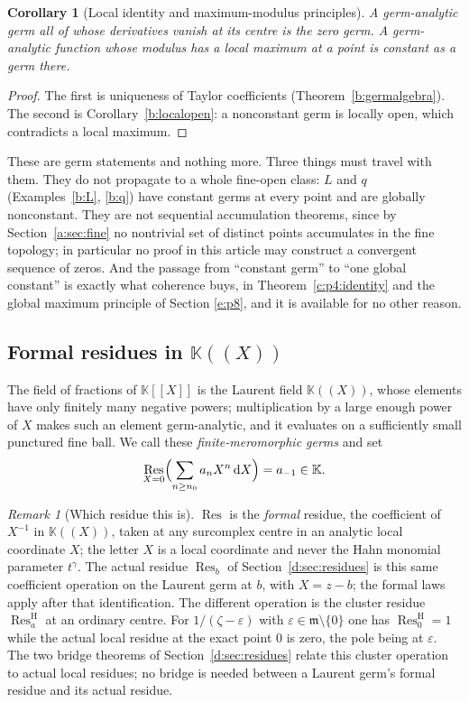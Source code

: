 \documentclass[11pt,a4paper]{article}
\numberwithin{equation}{section}
\newtheorem{corollary}[theorem]{Corollary}
\theoremstyle{definition}
\theoremstyle{remark}
\newtheorem{remark}[theorem]{Remark}
\theoremstyle{plain}
\newcommand{\K}{\mathbb K}
\newcommand{\mm}{\mathfrak m}
\newcommand{\tm}{t}
\DeclareMathOperator{\Res}{Res}                 %
\newcommand{\ResH}[1]{\Res^{\mathrm H}_{#1}}    %
\newcommand{\Resat}[1]{\Res_{#1}}               %
\newcommand{\dd}{\mathrm d}
\begin{document}
\begin{corollary}[Local identity and maximum-modulus principles]
\label{b:localidentity}
A germ-analytic germ all of whose derivatives vanish at its centre is the
zero germ. A germ-analytic function whose modulus has a local maximum at a
point is constant \emph{as a germ} there.
\end{corollary}

\begin{proof}
The first is uniqueness of Taylor coefficients
(Theorem~\ref{b:germalgebra}). The second is
Corollary~\ref{b:localopen}: a nonconstant germ is locally open, which
contradicts a local maximum.
\end{proof}

These are germ statements and nothing more. Three things must travel with
them. They do not propagate to a whole fine-open class: $L$ and $q$
(Examples~\ref{b:L}, \ref{b:q}) have constant germs at every point and are
globally nonconstant. They are not sequential accumulation theorems, since
by Section~\ref{a:sec:fine} no nontrivial set of distinct points accumulates in
the fine topology; in particular no proof in this article may construct a
convergent sequence of zeros. And the passage from ``constant germ'' to
``one global constant'' is exactly what coherence buys, in
Theorem~\ref{c:p4:identity} and the global maximum principle of
Section \ref{e:p8}, and it is available for no other reason.

\subsection{Formal residues in \texorpdfstring{$\K((X))$}{K((X))}}

The field of fractions of $\K[[X]]$ is the Laurent field $\K((X))$,
whose elements have only finitely many negative powers; multiplication by
a large enough power of $X$ makes such an element germ-analytic, and it
evaluates on a sufficiently small punctured fine ball. We call these
\emph{finite-meromorphic germs} and set
\[
 \Res_{X=0}\Bigl(\sum_{n\ge n_0}a_nX^{n}\,\dd X\Bigr)=a_{-1}\in\K .
\]

\begin{remark}[Which residue this is]
\label{b:residue-discipline}
$\Res$ is the \emph{formal} residue, the coefficient of $X^{-1}$ in
$\K((X))$, taken at any surcomplex centre in an analytic local coordinate
$X$; the letter $X$ is a local coordinate and never the Hahn monomial
parameter $\tm^{\gamma}$. The actual residue $\Resat b$ of Section~\ref{d:sec:residues} is this same coefficient operation on the Laurent
germ at $b$, with $X=z-b$; the formal laws apply after that identification.
The different operation is the cluster residue $\ResH a$ at an ordinary
centre. For $1/(\zeta-\varepsilon)$ with
$\varepsilon\in\mm\setminus\{0\}$ one has $\ResH0=1$ while the actual
local residue at the exact point $0$ is zero, the pole being at
$\varepsilon$. The two bridge theorems of Section~\ref{d:sec:residues}
relate this cluster operation to actual local residues; no bridge is
needed between a Laurent germ's formal residue and its actual residue.

\end{remark}
\end{document}
